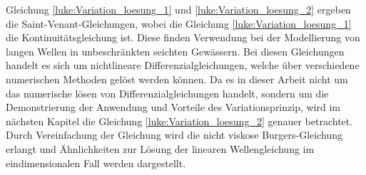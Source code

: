 Gleichung \eqref{luke:Variation_loesung_1} und \eqref{luke:Variation_loesung_2} ergeben die Saint-Venant-Gleichungen, wobei die Gleichung \eqref{luke:Variation_loesung_1} die Kontinuitätsgleichung ist.
Diese finden Verwendung bei der Modellierung von langen Wellen in unbeschränkten seichten Gewässern.
Bei diesen Gleichungen handelt es sich um nichtlineare Differenzialgleichungen, welche über verschiedene numerischen Methoden gelöst werden können.
Da es in dieser Arbeit nicht um das numerische lösen von Differenzialgleichungen handelt, sondern um die Demonstrierung der Anwendung und Vorteile des Variationsprinzip, wird im nächsten Kapitel die Gleichung \eqref{luke:Variation_loesung_2} genauer betrachtet.
Durch Vereinfachung der Gleichung wird die nicht viskose Burgers-Gleichung erlangt und Ähnlichkeiten zur Lösung der linearen Wellengleichung im eindimensionalen Fall werden dargestellt.

